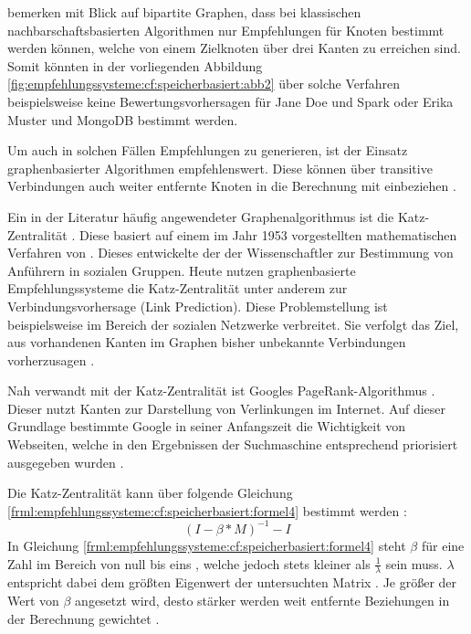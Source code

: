 \textcite[S. 7ff.]{huang:2004} bemerken mit Blick auf bipartite Graphen, dass bei klassischen nachbarschaftsbasierten Algorithmen nur Empfehlungen für Knoten bestimmt werden können, welche von einem Zielknoten über drei Kanten zu erreichen sind. Somit könnten in der vorliegenden Abbildung \ref{fig:empfehlungssysteme:cf:speicherbasiert:abb2} über solche Verfahren beispielsweise keine Bewertungsvorhersagen für Jane Doe und Spark oder Erika Muster und MongoDB bestimmt werden.

Um auch in solchen Fällen Empfehlungen zu generieren, ist der Einsatz graphenbasierter Algorithmen empfehlenswert. Diese können über transitive Verbindungen auch weiter entfernte Knoten in die Berechnung mit einbeziehen \cite[S. 60f.]{recommenderSystems:2016}.

Ein in der Literatur häufig angewendeter Graphenalgorithmus ist die Katz-Zentralität \cite[S. 1ff.]{zhan:2017}\cite[S. 6]{guns:2014}\cite[S. 1f.]{huang:2004}. Diese basiert auf einem im Jahr 1953 vorgestellten mathematischen Verfahren von \textcite[S. 1ff.]{katz:1953}. Dieses entwickelte der der Wissenschaftler zur Bestimmung von Anführern in sozialen Gruppen. Heute nutzen graphenbasierte Empfehlungssysteme die Katz-Zentralität unter anderem zur Verbindungsvorhersage (Link Prediction). Diese Problemstellung ist beispielsweise im Bereich der sozialen Netzwerke verbreitet. Sie verfolgt das Ziel, aus vorhandenen Kanten im Graphen bisher unbekannte Verbindungen vorherzusagen \cite[S. 1ff.]{libenNowell:2007}.

Nah verwandt mit der Katz-Zentralität ist Googles PageRank-Algorithmus \cite[S. 1]{was:2018}. Dieser nutzt Kanten zur Darstellung von Verlinkungen im Internet. Auf dieser Grundlage bestimmte Google in seiner Anfangszeit die Wichtigkeit von Webseiten, welche in den Ergebnissen der Suchmaschine entsprechend priorisiert ausgegeben wurden \cite[S. 3ff.]{page:1999}.

Die Katz-Zentralität kann über folgende Gleichung \ref{frml:empfehlungssysteme:cf:speicherbasiert:formel4} bestimmt werden \cite[S. 4]{libenNowell:2007}:
\begin{equation}
	(I - \beta * M)^{-1} - I
	\label{frml:empfehlungssysteme:cf:speicherbasiert:formel4}
\end{equation}
In Gleichung \ref{frml:empfehlungssysteme:cf:speicherbasiert:formel4} steht $\beta$ für eine Zahl im Bereich von null bis eins \cite[S. 6]{guns:2014}, welche jedoch stets kleiner als $\frac{1}{\lambda}$ sein muss. $\lambda$ entspricht dabei dem größten Eigenwert der untersuchten Matrix \cite[S. 6]{zhan:2017}. Je größer der Wert von $\beta$ angesetzt wird, desto stärker werden weit entfernte Beziehungen in der Berechnung gewichtet \cite[S. 6]{guns:2014}.

